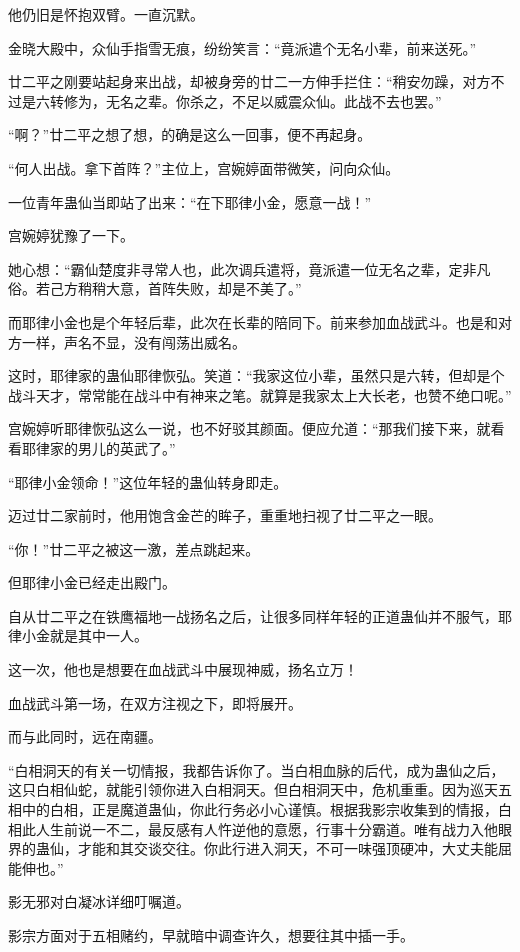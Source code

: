 \begin{this_body}
他仍旧是怀抱双臂。一直沉默。

金晓大殿中，众仙手指雪无痕，纷纷笑言：“竟派遣个无名小辈，前来送死。”

廿二平之刚要站起身来出战，却被身旁的廿二一方伸手拦住：“稍安勿躁，对方不过是六转修为，无名之辈。你杀之，不足以威震众仙。此战不去也罢。”

“啊？”廿二平之想了想，的确是这么一回事，便不再起身。

“何人出战。拿下首阵？”主位上，宫婉婷面带微笑，问向众仙。

一位青年蛊仙当即站了出来：“在下耶律小金，愿意一战！”

宫婉婷犹豫了一下。

她心想：“霸仙楚度非寻常人也，此次调兵遣将，竟派遣一位无名之辈，定非凡俗。若己方稍稍大意，首阵失败，却是不美了。”

而耶律小金也是个年轻后辈，此次在长辈的陪同下。前来参加血战武斗。也是和对方一样，声名不显，没有闯荡出威名。

这时，耶律家的蛊仙耶律恢弘。笑道：“我家这位小辈，虽然只是六转，但却是个战斗天才，常常能在战斗中有神来之笔。就算是我家太上大长老，也赞不绝口呢。”

宫婉婷听耶律恢弘这么一说，也不好驳其颜面。便应允道：“那我们接下来，就看看耶律家的男儿的英武了。”

“耶律小金领命！”这位年轻的蛊仙转身即走。

迈过廿二家前时，他用饱含金芒的眸子，重重地扫视了廿二平之一眼。

“你！”廿二平之被这一激，差点跳起来。

但耶律小金已经走出殿门。

自从廿二平之在铁鹰福地一战扬名之后，让很多同样年轻的正道蛊仙并不服气，耶律小金就是其中一人。

这一次，他也是想要在血战武斗中展现神威，扬名立万！

血战武斗第一场，在双方注视之下，即将展开。

而与此同时，远在南疆。

“白相洞天的有关一切情报，我都告诉你了。当白相血脉的后代，成为蛊仙之后，这只白相仙蛇，就能引领你进入白相洞天。但白相洞天中，危机重重。因为巡天五相中的白相，正是魔道蛊仙，你此行务必小心谨慎。根据我影宗收集到的情报，白相此人生前说一不二，最反感有人忤逆他的意愿，行事十分霸道。唯有战力入他眼界的蛊仙，才能和其交谈交往。你此行进入洞天，不可一味强顶硬冲，大丈夫能屈能伸也。”

影无邪对白凝冰详细叮嘱道。

影宗方面对于五相赌约，早就暗中调查许久，想要往其中插一手。


\end{this_body}
